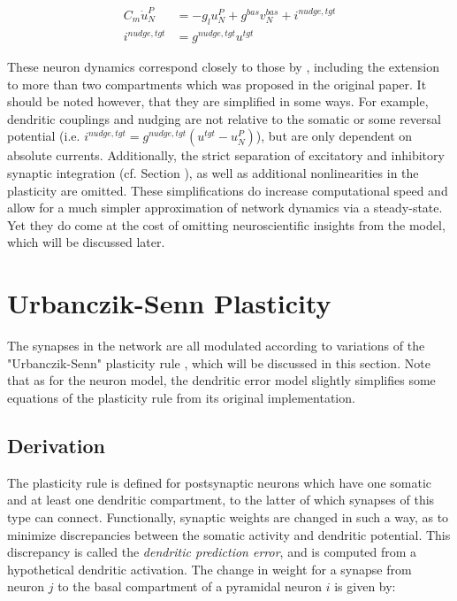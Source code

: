 \begin{align}
  C_m \dot{u}_N^P & = - g_l u_N^{P} + g^{bas} v_N^{bas} + i^{nudge, tgt} \\
  i^{nudge, tgt}  & = g^{nudge, tgt} u^{tgt}
\end{align}


These neuron dynamics correspond closely to those by \cite{urbanczik2014learning}, including the extension to more than
two compartments which was proposed in the original paper. It should be noted however, that they are simplified in some
ways. For example, dendritic couplings and nudging are not relative to the somatic or some reversal potential (i.e.
$i^{nudge, tgt}= g^{nudge, tgt} (u^{tgt} - u_N^P )$), but are only dependent on absolute currents. Additionally, the
strict separation of excitatory and inhibitory synaptic integration (cf. Section ), as well as
additional nonlinearities in the plasticity are omitted.  These simplifications do increase computational speed and
allow for a much simpler approximation of network dynamics via a steady-state. Yet they do come at the cost of omitting
neuroscientific insights from the model, which will be discussed later.

\section{Urbanczik-Senn Plasticity}\label{sec-urb-senn-plast}

The synapses in the network are all modulated according to variations of the "Urbanczik-Senn" plasticity rule
\citep{urbanczik2014learning}, which will be discussed in this section. Note that as for the neuron model, the dendritic
error model slightly simplifies some equations of the plasticity rule from its original implementation.

\subsection{Derivation}

The plasticity rule is defined for postsynaptic neurons which have one somatic and at least one dendritic compartment,
to the latter of which synapses of this type can connect. Functionally, synaptic weights are changed in such a way, as
to minimize discrepancies between the somatic activity and dendritic potential. This discrepancy is called the
\textit{dendritic prediction error}, and is computed from a hypothetical dendritic activation. The change in weight for
a synapse from neuron $j$ to the basal compartment of a pyramidal neuron $i$ is given by:

